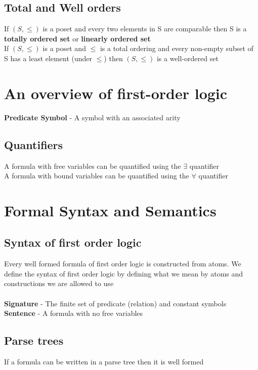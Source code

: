 \documentclass{article}[18pt]
\begin{document}
\subsection{Total and Well orders}
If $(S,\leq)$ is a poset and every two elements in S are comparable then S is a \textbf{totally ordered set} or \textbf{linearly ordered set}\\
If $(S,\leq)$ is a poset and $\leq$ is a total ordering and every non-empty subset of S has a least element (under $\leq$) then $(S,\leq)$ is a well-ordered set
\section{An overview of first-order logic}
\textbf{Predicate Symbol} - A symbol with an associated arity
\subsection{Quantifiers}
A formula with free variables can be quantified using the $\exists$ quantifier\\
A formula with bound variables can be quantified using the $\forall$ quantifier
\section{Formal Syntax and Semantics}
\subsection{Syntax of first order logic}
Every well formed formula of first order logic is constructed from atoms. We define the syntax of first order logic by defining what we mean by atoms and constructions we are allowed to use\\
\\
\textbf{Signature} - The finite set of predicate (relation) and constant symbols\\
\textbf{Sentence} - A formula with no free variables
\subsection{Parse trees}
If a formula can be written in a parse tree then it is well formed
\end{document}
